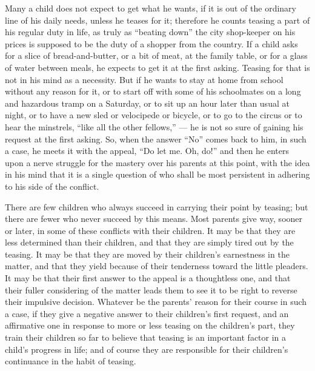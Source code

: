 \documentclass[
]{book}
\begin{document}
Many a child does not expect to get what he wants, if it is out of the ordinary line of his daily needs, unless he teases for it; therefore he counts teasing a part of his regular duty in life, as truly as ``beating down'' the city shop-keeper on his prices is supposed to be the duty of a shopper from the country. If a child asks for a slice of bread-and-butter, or a bit of meat, at the family table, or for a glass of water between meals, he expects to get it at the first asking. Teasing for that is not in his mind as a necessity. But if he wants to stay at home from school without any reason for it, or to start off with some of his schoolmates on a long and hazardous tramp on a Saturday, or to sit up an hour later than usual at night, or to have a new sled or velocipede or bicycle, or to go to the circus or to hear the minstrels, ``like all the other fellows,'' --- he is not so sure of gaining his request at the first asking. So, when the answer ``No'' comes back to him, in such a case, he meets it with the appeal, ``Do let me. Oh, do!'' and then he enters upon a nerve struggle for the mastery over his parents at this point, with the idea in his mind that it is a single question of who shall be most persistent in adhering to his side of the conflict.

There are few children who always succeed in carrying their point by teasing; but there are fewer who never succeed by this means. Most parents give way, sooner or later, in some of these conflicts with their children. It may be that they are less determined than their children, and that they are simply tired out by the teasing. It may be that they are moved by their children's earnestness in the matter, and that they yield because of their tenderness toward the little pleaders. It may be that their first answer to the appeal is a thoughtless one, and that their fuller considering of the matter leads them to see it to be right to reverse their impulsive decision. Whatever be the parents' reason for their course in such a case, if they give a negative answer to their children's first request, and an affirmative one in response to more or less teasing on the children's part, they train their children so far to believe that teasing is an important factor in a child's progress in life; and of course they are responsible for their children's continuance in the habit of teasing.
\end{document}
